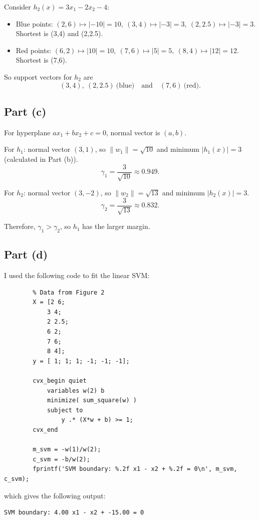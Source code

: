 \documentclass[fleqn]{article}
\begin{document}
    \medskip
    \noindent Consider $h_2(x)=3x_1-2x_2-4$:
    \begin{itemize}
        \item Blue points: $(2,6)\mapsto |{-10}|=10,\ (3,4)\mapsto |{-3}|=3,\ (2,2.5)\mapsto |{-3}|=3$. Shortest is (3,4) and (2,2.5).
        \item Red points: $(6,2)\mapsto |10|=10,\ (7,6)\mapsto |5|=5,\ (8,4)\mapsto |12|=12$. Shortest is (7,6).
    \end{itemize}
    So support vectors for $h_2$ are
    \[
        (3,4),\ (2,2.5)\ \text{(blue)}\quad\text{and}\quad (7,6)\ \text{(red)}.
    \]

    \subsection{Part (c)}
    \noindent For hyperplane $ax_1+bx_2+c=0$, normal vector is $(a,b)$.

    \medskip
    \noindent For $h_1$: normal vector $(3,1)$, so $\|w_1\|=\sqrt{10}$ and minimum $|h_1(x)|=3$ (calculated in Part (b)).
    \[
        \gamma_1=\frac{3}{\sqrt{10}}\approx 0.949.
    \]

    \noindent For $h_2$: normal vector $(3,-2)$, so $\|w_2\|=\sqrt{13}$ and minimum $|h_2(x)|=3$.
    \[
        \gamma_2=\frac{3}{\sqrt{13}}\approx 0.832.
    \]

    \noindent Therefore, $\gamma_1>\gamma_2$, so $h_1$ has the larger margin.

    \subsection{Part (d)}
    I used the following code to fit the linear SVM:
    \begin{verbatim}
        % Data from Figure 2
        X = [2 6;
            3 4;
            2 2.5;
            6 2;
            7 6;
            8 4];
        y = [ 1; 1; 1; -1; -1; -1];

        cvx_begin quiet
            variables w(2) b
            minimize( sum_square(w) )
            subject to
                y .* (X*w + b) >= 1;
        cvx_end

        m_svm = -w(1)/w(2);
        c_svm = -b/w(2);
        fprintf('SVM boundary: %.2f x1 - x2 + %.2f = 0\n', m_svm, c_svm);
    \end{verbatim}

    \noindent which gives the following output:
    \begin{verbatim}
SVM boundary: 4.00 x1 - x2 + -15.00 = 0
    \end{verbatim}
\end{document}
